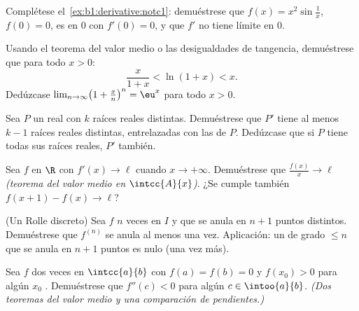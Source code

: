 \begin{exercise}[$\star$]\label{exo:b1:derivative:2}
Complétese el~\cref{ex:b1:derivative:notc1}: demuéstrese que
$f(x) = x^2 \sin\frac1x$, $f(0) = 0$, es  en $0$ con
$f'(0) = 0$, y que $f'$ no tiene límite en $0$.
\end{exercise}

\begin{exercise}[$\star$]\label{exo:b1:derivative:3}
Usando el teorema del valor medio o las desigualdades de tangencia,
demuéstrese que para todo $x > 0$:
\[
\frac{x}{1 + x} < \ln(1 + x) < x .
\]
Dedúzcase $\lim_{n\to\infty} \bigl(1 + \frac xn\bigr)^n = \eu^x$ para
todo $x > 0$.
\end{exercise}

\begin{exercise}[$\star$]\label{exo:b1:derivative:4}
Sea $P$ un  real con $k$ raíces reales distintas.
Demuéstrese que $P'$ tiene al menos $k - 1$ raíces reales distintas,
entrelazadas con las de $P$. Dedúzcase que si $P$ tiene todas sus
raíces reales, $P'$ también.
\end{exercise}

\begin{exercise}[$\star\star$]\label{exo:b1:derivative:5}
Sea $f$  en $\R$ con $f' (x)\to \ell$ cuando
$x \to +\infty$. Demuéstrese que $\frac{f(x)}{x} \to \ell$
\emph{(teorema del valor medio en $\intcc{A}{x}$)}. ¿Se cumple también
$f(x+1) - f(x) \to \ell$?
\end{exercise}

\begin{exercise}[$\star\star$]\label{exo:b1:derivative:6}
(Un Rolle discreto) Sea $f$ $n$ veces  en $I$ y que se
anula en $n + 1$ puntos distintos. Demuéstrese que $f^{(n)}$ se anula
al menos una vez. Aplicación: un  de grado $\leq n$ que se
anula en $n+1$ puntos es nulo (una vez más).
\end{exercise}

\begin{exercise}[$\star\star$]\label{exo:b1:derivative:7}
Sea $f$ dos veces  en $\intcc{a}{b}$ con
$f(a) = f(b) = 0$ y $f(x_0) > 0$ para algún $x_0$ .
Demuéstrese que $f''(c) < 0$ para algún $c \in \intoo{a}{b}$.
\emph{(Dos teoremas del valor medio y una comparación de pendientes.)}
\end{exercise}


